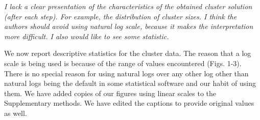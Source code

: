 \documentclass[11pt, oneside]{article}   	%
\begin{document}
\emph{I lack a clear presentation of the characteristics of the obtained cluster solution (after each step). For example, the distribution of cluster sizes. I think the authors should avoid using natural log scale, because it makes the interpretation more difficult. I also would like to see some statistic.}

We now report descriptive statistics for the cluster data. The reason that a log scale is being used is because of the range of values encountered (Figs. 1-3). There is no special reason for using natural logs over any other log other than natural logs being the default in some statistical software and our habit of using them. We have added copies of our figures using linear scales to the Supplementary methods. We have edited the captions to provide original values as well. 

\vspace{4 mm}
\end{document}
